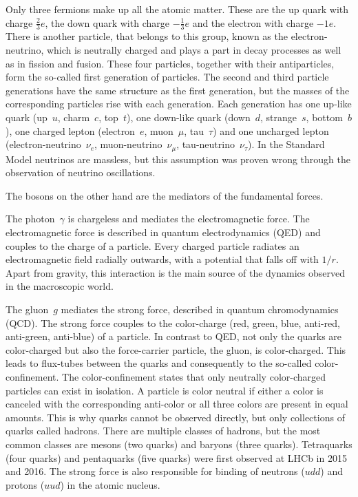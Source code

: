 Only three fermions make up all the atomic matter. 
These are the up quark with charge $\frac{2}{3}e$, the down quark with charge $-\frac{1}{3}e$ and the electron with charge $-1e$.
There is another particle, that belongs to this group, known as the electron-neutrino, which is neutrally charged and plays a part in decay processes as well as in fission and fusion.
These four particles, together with their antiparticles, form the so-called first generation of particles.
The second and third particle generations have the same structure as the first generation, but the masses of the corresponding particles rise with each generation.
Each generation has one up-like quark (up~$u$, charm~$c$, top~$t$), one down-like quark (down~$d$, strange~$s$, bottom~$b$), one charged lepton (electron~$e$, muon~$\mu$, tau~$\tau$) and one uncharged lepton (electron-neutrino~$\nu_e$, muon-neutrino~$\nu_\mu$, tau-neutrino~$\nu_\tau$).
In the Standard Model neutrinos are massless, but this assumption was proven wrong through the observation of neutrino oscillations. \cite{NeutrinoMassSK,NeutrinoMassSNO}

The bosons on the other hand are the mediators of the fundamental forces.

The photon~$\gamma$ is chargeless and mediates the electromagnetic force.
The electromagnetic force is described in quantum electrodynamics (QED) and couples to the charge of a particle.
Every charged particle radiates an electromagnetic field radially outwards, with a potential that falls off with $1/r$.
Apart from gravity, this interaction is the main source of the dynamics observed in the macroscopic world.

The gluon~$g$ mediates the strong force, described in quantum chromodynamics (QCD).
The strong force couples to the color-charge (red, green, blue, anti-red, anti-green, anti-blue) of a particle.
In contrast to QED, not only the quarks are color-charged but also the force-carrier particle, the gluon, is color-charged.
This leads to flux-tubes between the quarks and consequently to the so-called color-confinement.
The color-confinement states that only neutrally color-charged particles can exist in isolation.
A particle is color neutral if either a color is canceled with the corresponding anti-color or all three colors are present in equal amounts.
This is why quarks cannot be observed directly, but only collections of quarks called hadrons.
There are multiple classes of hadrons, but the most common classes are mesons (two quarks) and baryons (three quarks).
Tetraquarks (four quarks) and pentaquarks (five quarks) were first observed at LHCb in 2015 and 2016. \cite{TetraquarkLHCb,PentaquarkLHCb}
The strong force is also responsible for binding of neutrons ($udd$) and protons ($uud$) in the atomic nucleus.

